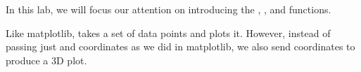 In this lab, we will focus our attention on introducing the , , and  functions.

Like matplotlib,  takes a set of data points and plots it.
However, instead of passing just  and  coordinates as we did in matplotlib, we also send  coordinates to produce a 3D plot.

